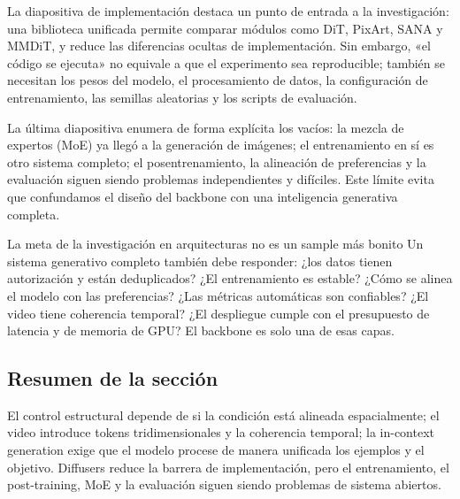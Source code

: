 
La diapositiva de implementación destaca un punto de entrada a la investigación: una biblioteca unificada permite comparar módulos como DiT, PixArt, SANA y MMDiT, y reduce las diferencias ocultas de implementación. Sin embargo, «el código se ejecuta» no equivale a que el experimento sea reproducible; también se necesitan los pesos del modelo, el procesamiento de datos, la configuración de entrenamiento, las semillas aleatorias y los scripts de evaluación.


La última diapositiva enumera de forma explícita los vacíos: la mezcla de expertos (MoE) ya llegó a la generación de imágenes; el entrenamiento en sí es otro sistema completo; el posentrenamiento, la alineación de preferencias y la evaluación siguen siendo problemas independientes y difíciles. Este límite evita que confundamos el diseño del backbone con una inteligencia generativa completa.


\begin{importantbox}{La meta de la investigación en arquitecturas no es un sample más bonito}
Un sistema generativo completo también debe responder: ¿los datos tienen autorización y están deduplicados? ¿El entrenamiento es estable? ¿Cómo se alinea el modelo con las preferencias? ¿Las métricas automáticas son confiables? ¿El video tiene coherencia temporal? ¿El despliegue cumple con el presupuesto de latencia y de memoria de GPU? El backbone es solo una de esas capas.
\end{importantbox}

\subsection{Resumen de la sección}

El control estructural depende de si la condición está alineada espacialmente; el video introduce tokens tridimensionales y la coherencia temporal; la in-context generation exige que el modelo procese de manera unificada los ejemplos y el objetivo. Diffusers reduce la barrera de implementación, pero el entrenamiento, el post-training, MoE y la evaluación siguen siendo problemas de sistema abiertos.
